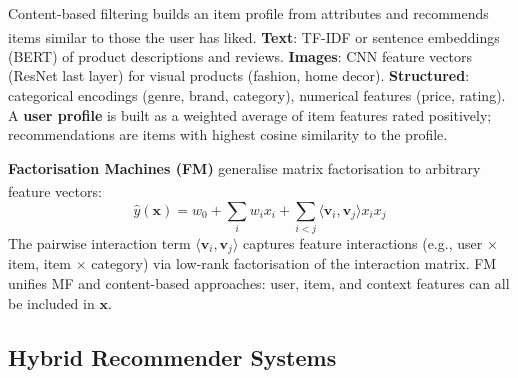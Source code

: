\begin{tcbitemize}[ skin=sectionraster ]

    \tcbitem[title=Feature Extraction for Items, raster multicolumn=3]
    Content-based filtering builds an item profile from attributes and recommends items similar to those the user has liked\textsuperscript{\cite[][pp.~65--70]{aggarwalRecommenderSystems2016}}.
    \textbf{Text}: TF-IDF or sentence embeddings (BERT) of product descriptions and reviews.
    \textbf{Images}: CNN feature vectors (ResNet last layer) for visual products (fashion, home decor).
    \textbf{Structured}: categorical encodings (genre, brand, category), numerical features (price, rating).
    A \textbf{user profile} is built as a weighted average of item features rated positively; recommendations are items with highest cosine similarity to the profile.

    \tcbitem[title=Factorisation Machines, raster multicolumn=3]
    \textbf{Factorisation Machines (FM)} generalise matrix factorisation to arbitrary feature vectors\textsuperscript{\cite[][p.~995]{rendleFactorizationMachines2010}}:
    \begin{equation}
        \hat{y}(\mathbf{x}) = w_0 + \sum_i w_i x_i + \sum_{i<j} \langle \mathbf{v}_i, \mathbf{v}_j \rangle x_i x_j
    \end{equation}
    The pairwise interaction term $\langle \mathbf{v}_i, \mathbf{v}_j \rangle$ captures feature interactions (e.g., user $\times$ item, item $\times$ category) via low-rank factorisation of the interaction matrix.
    FM unifies MF and content-based approaches: user, item, and context features can all be included in $\mathbf{x}$.

\end{tcbitemize}

\subsection{Hybrid Recommender Systems}

